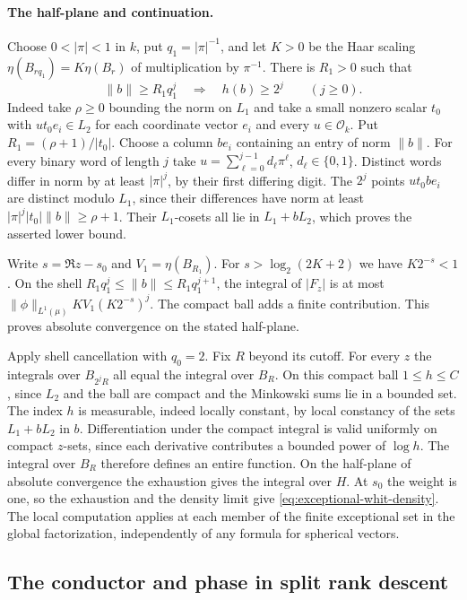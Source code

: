 \paragraph{The half-plane and continuation.}
Choose \(0<|\pi|<1\) in \(k\), put \(q_1=|\pi|^{-1}\), and let
\(K>0\) be the Haar scaling \(\eta(B_{rq_1})=K\eta(B_r)\) of
multiplication by \(\pi^{-1}\). There is \(R_1>0\) such that
\[
       \|b\|\geq R_1q_1^j\quad\Longrightarrow\quad h(b)\geq 2^j
       \qquad(j\geq0).
\]
Indeed take \(\rho\geq0\) bounding the norm on \(L_1\) and take a
small nonzero scalar \(t_0\) with \(u t_0 e_i\in L_2\) for each
coordinate vector \(e_i\) and every \(u\in\mathcal O_k\). Put
\(R_1=(\rho+1)/|t_0|\). Choose a column \(b e_i\) containing an
entry of norm \(\|b\|\). For every binary word of length \(j\) take
\(u=\sum_{\ell=0}^{j-1}d_\ell\pi^\ell\), \(d_\ell\in\{0,1\}\).
Distinct words differ in norm by at least \(|\pi|^j\), by their
first differing digit. The \(2^j\) points \(u t_0 b e_i\) are
distinct modulo \(L_1\), since their differences have norm at
least \(|\pi|^j|t_0|\|b\|\geq \rho+1\). Their \(L_1\)-cosets
all lie in \(L_1+bL_2\), which proves the asserted lower bound.

Write \(s=\Re z-s_0\) and \(V_1=\eta(B_{R_1})\).
For \(s>\log_2(2K+2)\) we have \(K2^{-s}<1\). On the shell
\(R_1q_1^j\leq\|b\|\leq R_1q_1^{j+1}\), the integral
of \(|F_z|\) is at most
\(\|\phi\|_{L^1(\mu)}K V_1(K2^{-s})^j\). The compact ball adds a
finite contribution. This proves absolute convergence on the
stated half-plane.

Apply shell cancellation with \(q_0=2\). Fix \(R\) beyond its cutoff.
For every \(z\) the integrals over \(B_{2^jR}\) all equal the integral
over \(B_R\). On this compact ball \(1\leq h\leq C\), since \(L_2\)
and the ball are compact and the Minkowski sums lie in a bounded
set. The index \(h\) is measurable, indeed locally constant, by
local constancy of the sets \(L_1+bL_2\) in \(b\).
Differentiation under the compact integral is valid uniformly on
compact \(z\)-sets, since each derivative contributes a bounded
power of \(\log h\). The integral over \(B_R\) therefore defines
an entire function. On the half-plane of absolute convergence the
exhaustion gives the integral over \(H\). At \(s_0\) the weight is
one, so the exhaustion and the density limit give
\eqref{eq:exceptional-whit-density}. The local computation applies
at each member of the finite exceptional set in the global
factorization, independently of any formula for spherical vectors.

\subsection{The conductor and phase in split rank descent}

